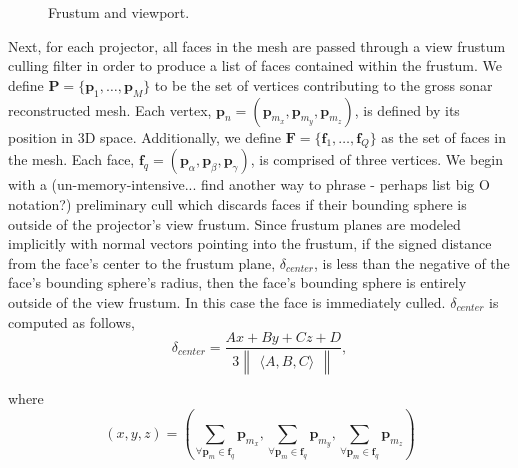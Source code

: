 \documentclass[a4paper,twoside]{article}
\begin{document}
\begin{figure}[!h]
   \vspace{-0.2cm}
   \caption{Frustum and viewport.}
  \label{fig:frustum}
 \end{figure}

Next, for each projector, all faces in the mesh are passed through a view frustum culling filter in order to produce a list of faces contained within the frustum. We define $\mathbf{P} = \{\mathbf{p}_{1},\dots,\mathbf{p}_{M}\}$ to be the set of vertices contributing to the gross sonar reconstructed mesh. Each vertex, $\mathbf{p}_{n} =  (\mathbf{p}_{m_{x}},\mathbf{p}_{m_{y}},\mathbf{p}_{m_{z}})$, is defined by its position in 3D space. Additionally, we define $\mathbf{F} = \{\mathbf{f}_{1},\dots,\mathbf{f}_{Q}\}$ as the set of faces in the mesh. Each face, $\mathbf{f}_{q} = (\mathbf{p}_{\alpha}, \mathbf{p}_{\beta}, \mathbf{p}_{\gamma})$, is comprised of three vertices. We begin with a (un-memory-intensive... find another way to phrase - perhaps list big O notation?) preliminary cull which discards faces if their bounding sphere is outside of the projector's view frustum. Since frustum planes are modeled implicitly with normal vectors pointing into the frustum, if the signed distance from the face's center to the frustum plane, $\delta_{center}$, is less than the negative of the face's bounding sphere's radius, then the face's bounding sphere is entirely outside of the view frustum. In this case the face is immediately culled. $\delta_{center}$ is computed as follows,
%
\begin{equation}
\delta_{center} = \frac{Ax + By + Cz + D}{3 \begin{Vmatrix} \langle A, B, C \rangle \end{Vmatrix}},
\end{equation}

where
\begin{equation}
(x, y, z) = \left(\sum\limits_{\forall \mathbf{p}_{m} \in \mathbf{f}_{q}} \mathbf{p}_{m_{x}}, \sum\limits_{\forall \mathbf{p}_{m} \in \mathbf{f}_{q}} \mathbf{p}_{m_{y}}, \sum\limits_{\forall \mathbf{p}_{m} \in \mathbf{f}_{q}} \mathbf{p}_{m_{z}}\right)
\end{equation}
\end{document}
